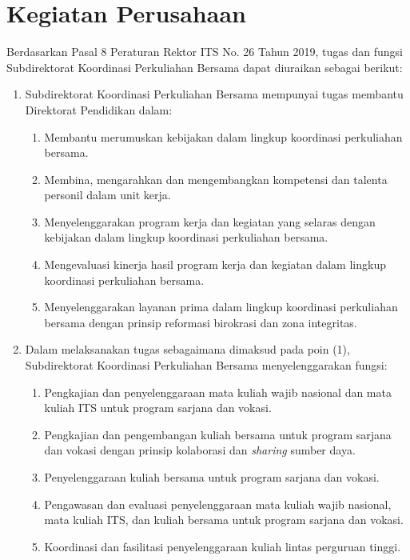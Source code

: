 \documentclass{file/KP-ITS}
\theoremstyle{definition}
\theoremstyle{definition}
\theoremstyle{plain}
\begin{document}
\section{Kegiatan Perusahaan}
Berdasarkan Pasal 8 Peraturan Rektor ITS No. 26 Tahun 2019, tugas dan fungsi Subdirektorat Koordinasi Perkuliahan Bersama dapat diuraikan sebagai berikut:
\begin{enumerate}
    \item Subdirektorat Koordinasi Perkuliahan Bersama mempunyai tugas membantu Direktorat Pendidikan dalam:
    \begin{enumerate}
        \item Membantu merumuskan kebijakan dalam lingkup koordinasi perkuliahan bersama.
        \item Membina, mengarahkan dan mengembangkan kompetensi dan talenta personil dalam unit kerja.
        \item Menyelenggarakan program kerja dan kegiatan yang selaras dengan kebijakan dalam lingkup koordinasi perkuliahan bersama.
        \item Mengevaluasi kinerja hasil program kerja dan kegiatan dalam lingkup koordinasi perkuliahan bersama.
        \item Menyelenggarakan layanan prima dalam lingkup koordinasi perkuliahan bersama dengan prinsip reformasi birokrasi dan zona integritas.
    \end{enumerate}

    \item Dalam melaksanakan tugas sebagaimana dimaksud pada poin (1), Subdirektorat Koordinasi Perkuliahan Bersama menyelenggarakan fungsi:
    \begin{enumerate}
        \item Pengkajian dan penyelenggaraan mata kuliah wajib nasional dan mata kuliah ITS untuk program sarjana dan vokasi.
        \item Pengkajian dan pengembangan kuliah bersama untuk program sarjana dan vokasi dengan prinsip kolaborasi dan \textit{sharing} sumber daya.
        \item Penyelenggaraan kuliah bersama untuk program sarjana dan vokasi.
        \item Pengawasan dan evaluasi penyelenggaraan mata kuliah wajib nasional, mata kuliah ITS, dan kuliah bersama untuk program sarjana dan vokasi.
        \item Koordinasi dan fasilitasi penyelenggaraan kuliah lintas perguruan tinggi.
    \end{enumerate}
\end{enumerate}
\end{document}
